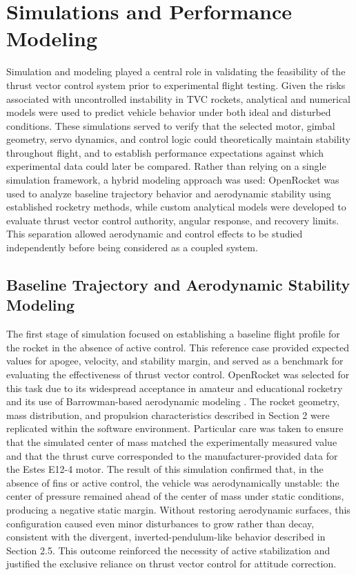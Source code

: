 \section{Simulations and Performance Modeling}

Simulation and modeling played a central role in validating the feasibility of the thrust vector control system prior to experimental flight testing. Given the risks associated with uncontrolled instability in TVC rockets, analytical and numerical models were used to predict vehicle behavior under both ideal and disturbed conditions. These simulations served to verify that the selected motor, gimbal geometry, servo dynamics, and control logic could theoretically maintain stability throughout flight, and to establish performance expectations against which experimental data could later be compared. Rather than relying on a single simulation framework, a hybrid modeling approach was used: OpenRocket \cite{openrocket2023} was used to analyze baseline trajectory behavior and aerodynamic stability using established rocketry methods, while custom analytical models were developed to evaluate thrust vector control authority, angular response, and recovery limits. This separation allowed aerodynamic and control effects to be studied independently before being considered as a coupled system.



\subsection{Baseline Trajectory and Aerodynamic Stability Modeling}

The first stage of simulation focused on establishing a baseline flight profile for the rocket in the absence of active control. This reference case provided expected values for apogee, velocity, and stability margin, and served as a benchmark for evaluating the effectiveness of thrust vector control.
OpenRocket was selected for this task due to its widespread acceptance in amateur and educational rocketry and its use of Barrowman-based aerodynamic modeling \cite{barrowman1967}. The rocket geometry, mass distribution, and propulsion characteristics described in Section 2 were replicated within the software environment. Particular care was taken to ensure that the simulated center of mass matched the experimentally measured value and that the thrust curve corresponded to the manufacturer-provided data for the Estes E12-4 motor. The result of this simulation confirmed that, in the absence of fins or active control, the vehicle was aerodynamically unstable: the center of pressure remained ahead of the center of mass under static conditions, producing a negative static margin. Without restoring aerodynamic surfaces, this configuration caused even minor disturbances to grow rather than decay, consistent with the divergent, inverted-pendulum-like behavior described in Section 2.5. This outcome reinforced the necessity of active stabilization and justified the exclusive reliance on thrust vector control for attitude correction.


